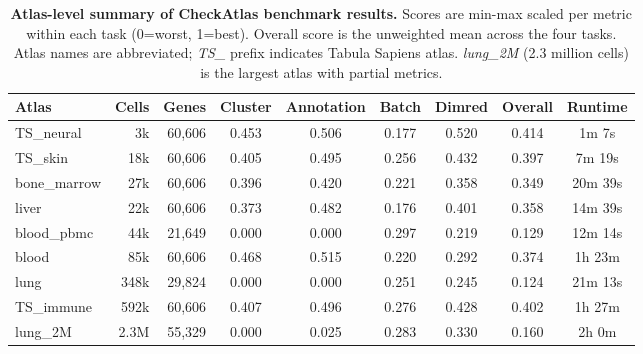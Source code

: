 
\begin{table}[htbp]
\centering
\caption{\textbf{Atlas-level summary of CheckAtlas benchmark results.}
Scores are min-max scaled per metric within each task (0=worst, 1=best).
Overall score is the unweighted mean across the four tasks.
Atlas names are abbreviated; \textit{TS\_} prefix indicates Tabula Sapiens atlas.
\emph{lung\_2M} (2.3 million cells) is the largest atlas with partial metrics.}
\label{tab:atlas_summary}
\small
\begin{tabular}{l r r c c c c c c}
\toprule
\textbf{Atlas} & \textbf{Cells} & \textbf{Genes} & \textbf{Cluster} & \textbf{Annotation} & \textbf{Batch} & \textbf{Dimred} & \textbf{Overall} & \textbf{Runtime} \\
\midrule
TS\_neural & 3k & 60,606 & 0.453 & 0.506 & 0.177 & 0.520 & 0.414 & 1m 7s \\
TS\_skin & 18k & 60,606 & 0.405 & 0.495 & 0.256 & 0.432 & 0.397 & 7m 19s \\
bone\_marrow & 27k & 60,606 & 0.396 & 0.420 & 0.221 & 0.358 & 0.349 & 20m 39s \\
liver & 22k & 60,606 & 0.373 & 0.482 & 0.176 & 0.401 & 0.358 & 14m 39s \\
blood\_pbmc & 44k & 21,649 & 0.000 & 0.000 & 0.297 & 0.219 & 0.129 & 12m 14s \\
blood & 85k & 60,606 & 0.468 & 0.515 & 0.220 & 0.292 & 0.374 & 1h 23m \\
lung & 348k & 29,824 & 0.000 & 0.000 & 0.251 & 0.245 & 0.124 & 21m 13s \\
TS\_immune & 592k & 60,606 & 0.407 & 0.496 & 0.276 & 0.428 & 0.402 & 1h 27m \\
lung\_2M & 2.3M & 55,329 & 0.000 & 0.025 & 0.283 & 0.330 & 0.160 & 2h 0m \\
\bottomrule
\end{tabular}
\end{table}
